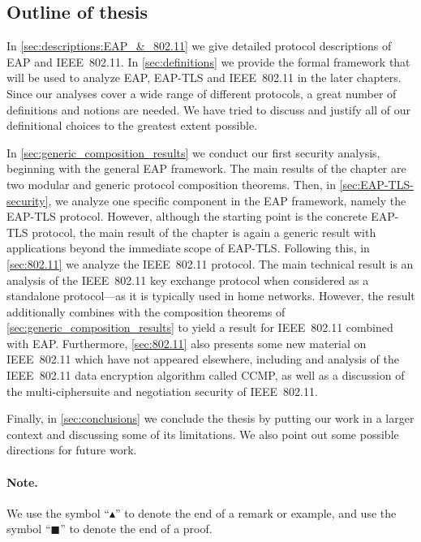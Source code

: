 \subsection{Outline of thesis}

In \cref{sec:descriptions:EAP_&_802.11} we give detailed protocol descriptions of EAP and IEEE~802.11.
In \cref{sec:definitions} we provide the formal framework that will be used to analyze EAP, EAP-TLS and IEEE~802.11 in the later chapters.
Since our analyses cover a wide range of different protocols,
a great number of definitions and notions are needed.
We have tried to discuss and justify all of our definitional choices to the greatest extent possible.


In \cref{sec:generic_composition_results} we conduct our first security analysis,
beginning with the general EAP framework.
The main results of the chapter are two modular and generic protocol composition theorems.
Then,
in \cref{sec:EAP-TLS-security},
we analyze one specific component in the EAP framework,
namely the EAP-TLS protocol. 
However,
although the starting point is the concrete EAP-TLS protocol,
the main result of the chapter is again a generic result with applications beyond the immediate scope of EAP-TLS.
Following this,
in \cref{sec:802.11} we analyze the IEEE~802.11 protocol.
The main technical result is an analysis of the IEEE~802.11 key exchange protocol when considered as a standalone protocol---as it is typically used in home networks.
However,
the result additionally combines with the composition theorems of \cref{sec:generic_composition_results} to yield a result for IEEE~802.11 combined with EAP. 
Furthermore,
\cref{sec:802.11} also presents some new material on IEEE~802.11 which have not appeared elsewhere,
including and analysis of the IEEE~802.11 data encryption algorithm called CCMP,
as well as a discussion of the multi-ciphersuite and negotiation security of IEEE~802.11.


Finally,
in \cref{sec:conclusions} we conclude the thesis by putting our work in a larger context and discussing some of its limitations.
We also point out some possible directions for future work.
 

\paragraph{Note.}
We use the symbol ``$\blacktriangle$'' to denote the end of a remark or example,
and use the symbol ``$\blacksquare$'' to denote the end of a proof.